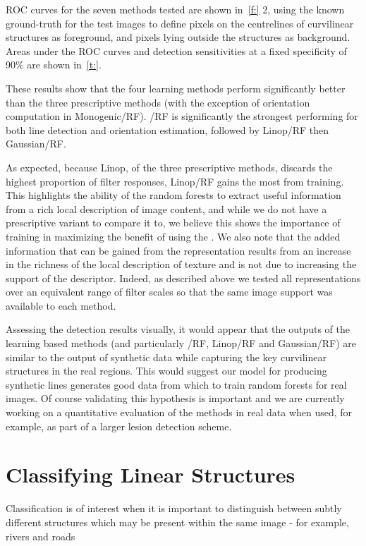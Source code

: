 ROC curves for the seven methods tested are shown in~\ref{f:} 2, using the known ground-truth for the test images to define pixels on the centrelines of curvilinear structures as foreground, and pixels lying outside the structures as background. Areas under the ROC curves and detection sensitivities at a fixed specificity of 90\% are shown in~\ref{t:}. 

These results show that the four learning methods perform significantly better than the three prescriptive methods (with the exception of orientation computation in Monogenic/RF). \dtcwt{}/RF is significantly the strongest performing for both line detection and orientation estimation, followed by Linop/RF then Gaussian/RF.

As expected, because Linop, of the three prescriptive methods, discards the highest proportion of filter responses, Linop/RF gains the most from training. This highlights the ability of the random forests to extract useful information from a rich local description of image content, and while we do not have a prescriptive variant to compare it to, we believe this shows the importance of training in maximizing the benefit of using the \dtcwt{}. We also note that the added information that can be gained from the \dtcwt representation results from an increase in the richness of the local description of texture and is not due to increasing the support of the descriptor. Indeed, as described above we tested all representations over an equivalent range of filter scales so that the same image support was available to each method.

Assessing the detection results visually, it would appear that the outputs of the learning based methods (and particularly \dtcwt{}/RF, Linop/RF and Gaussian/RF) are similar to the output of synthetic data while capturing the key curvilinear structures in the real regions. This would suggest our model for producing synthetic lines generates good data from which to train random forests for real images. Of course validating this hypothesis is important and we are currently working on a quantitative evaluation of the methods in real data when used, for example, as part of a larger lesion detection scheme.


\section{Classifying Linear Structures}
Classification is of interest when it is important to distinguish between subtly different structures which may be present within the same image - for example, rivers and roads


